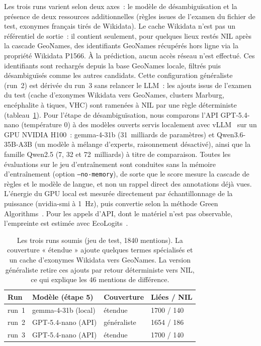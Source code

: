 \documentclass[10pt,twoside]{article}
\begin{document}
Les trois runs varient selon deux axes~: le modèle de désambiguïsation et la présence de deux
ressources additionnelles (règles issues de l'examen du fichier de test, exonymes français
tirés de Wikidata). Le cache Wikidata n'est pas un référentiel de sortie~: il contient seulement,
pour quelques lieux restés NIL après la cascade GeoNames, des identifiants GeoNames récupérés
hors ligne via la propriété Wikidata P1566. À la prédiction, aucun accès réseau n'est effectué.
Ces identifiants sont rechargés depuis la base GeoNames locale, filtrés puis désambiguïsés comme
les autres candidats. Cette configuration généraliste (run~2) est dérivée du run~3 sans relancer le LLM~: les
ajouts issus de l'examen du test (cache d'exonymes Wikidata vers GeoNames, clusters Marburg,
encéphalite à tiques, VHC) sont ramenées à NIL par une règle déterministe
(tableau~\ref{tab:runs}). Pour l'étape de désambiguïsation,
nous comparons l'API GPT-5.4-nano (température 0) à des modèles ouverts servis localement avec
vLLM~\cite{vllm2023} sur un GPU NVIDIA H100~: gemma-4-31b (31~milliards de paramètres) et
Qwen3.6-35B-A3B (un modèle à mélange d'experts, raisonnement désactivé), ainsi que la famille
Qwen2.5 (7, 32 et 72~milliards) à titre de comparaison. Toutes les évaluations sur le jeu d'entraînement sont
conduites sans la mémoire d'entraînement (option \texttt{--no-memory}), de sorte que le score mesure
la cascade de règles et le modèle de langue, et non un rappel direct des annotations déjà vues.
L'énergie du GPU local est mesurée
directement par échantillonnage de la puissance (nvidia-smi à 1~Hz), puis convertie selon la
méthode Green Algorithms~\cite{lannelongue2021green}. Pour les appels d'API, dont le matériel
n'est pas observable, l'empreinte est estimée avec EcoLogits~\cite{ecologits}.

\begin{table}[!h]
\centering
\small
\setlength{\tabcolsep}{5pt}
\begin{tabular}{llll}
\toprule
Run & Modèle (étape 5) & Couverture & Liées / NIL \\
\midrule
run~1 & gemma-4-31b (local) & étendue & 1700 / 140 \\
run~2 & GPT-5.4-nano (API) & généraliste & 1654 / 186 \\
run~3 & GPT-5.4-nano (API) & étendue & 1700 / 140 \\
\bottomrule
\end{tabular}
\caption{Les trois runs soumis (jeu de test, 1840 mentions). La couverture « étendue » ajoute
quelques termes spécialisés et un cache d'exonymes Wikidata vers GeoNames. La version généraliste
retire ces ajouts par retour déterministe vers NIL, ce qui explique les 46 mentions de différence.}
\label{tab:runs}
\end{table}
\end{document}
